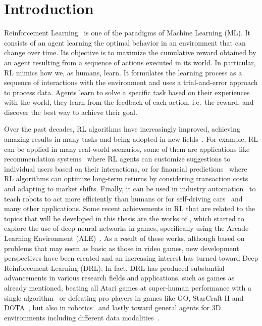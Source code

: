 
\chapter{Introduction}
\label{ch:introduction}
Reinforcement Learning~\citep{sutton1998introduction} is one of the paradigms of Machine Learning (ML).
It consists of an agent learning the optimal behavior in an environment that can change over time.
Its objective is to maximize the cumulative reward obtained by an agent resulting from a sequence of actions executed in its world.
In particular, RL mimics how we, as humans, learn.
It formulates the learning process as a sequence of interactions with the environment and uses a trial-and-error approach to process data.
Agents learn to solve a specific task based on their experiences with the world, they learn from the feedback of each action, i.e.\ the reward, and discover the best way to achieve their goal.

Over the past decades, RL algorithms have increasingly improved, achieving amazing results in many tasks and being adopted in new fields~\citep{li2017deep, zhang2020deep}.
For example, RL can be applied in many real-world scenarios, some of them are applications like recommendation systems~\citep{zhao2019deep} where RL agents can customize suggestions to individual users based on their interactions, or for financial predictions~\citep{zhang2019deep} where RL algorithms can optimize long-term returns by considering transaction costs and adapting to market shifts.
Finally, it can be used in industry automation~\citep{levine2018learning} to teach robots to act more efficiently than humans or for self-driving cars~\citep{kiran2021deep} and many other applications.
Some recent achievements in RL that are related to the topics that will be developed in this thesis are
the works of \citet{mnih2013playing, mnih2015human}, which started to explore the use of deep neural networks in games, specifically using the Arcade Learning Environment (ALE)~\citep{bellemare2013atari}.
As a result of these works, although based on problems that may seem as basic as those in video games, new development perspectives have been created and an increasing interest has turned toward Deep Reinforcement Learning (DRL).
In fact, DRL has produced substantial advancements in various research fields and applications, such as games as already mentioned, beating all Atari games at super-human performance with a single algorithm~\citep{agent57} or defeating pro players in games like GO, StarCraft II and DOTA~\citep{alphago, starcraft, dota}, but also in robotics~\citep{rlrob, bousmalis2023robocat} and lastly toward general agents for 3D environments including different data modalities~\citep{sima2024}.

